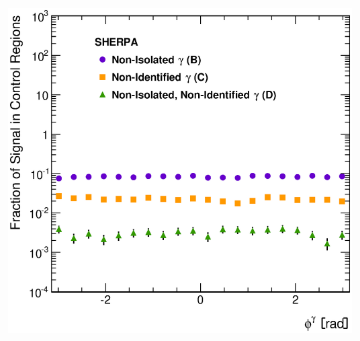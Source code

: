 \documentclass[12pt, twoside]{article}
\numberwithin{equation}{section}
\numberwithin{figure}{section}
\newenvironment{changemargin}[2]{%
\begin{list}{}{%
\setlength{\topsep}{0pt}%
\setlength{\leftmargin}{#1}%
\setlength{\rightmargin}{#2}%
\setlength{\listparindent}{\parindent}%
\setlength{\itemindent}{\parindent}%
\setlength{\parsep}{\parskip}%
}%
\item[]}{\end{list}}
\begin{document}
\begin{figure}
\begin{changemargin}{-1.0cm}{-0.75cm}
\begin{changemargin}{-0.75cm}{-1.0cm}
\begin{subfigure}[b]{0.37\textwidth}
            \subcaption{}
            \label{fig:SLFEtaPhoton}
        \end{subfigure}
        \begin{subfigure}[b]{0.37\textwidth}
            \includegraphics[width=\textwidth]{./images/SignalLeakageFractionsSherpa/SLF-103.eps}
            \subcaption{}
            \label{fig:SLFPhiPhoton}
        \end{subfigure}


\end{changemargin}
\end{changemargin}
\end{figure}
\end{document}
